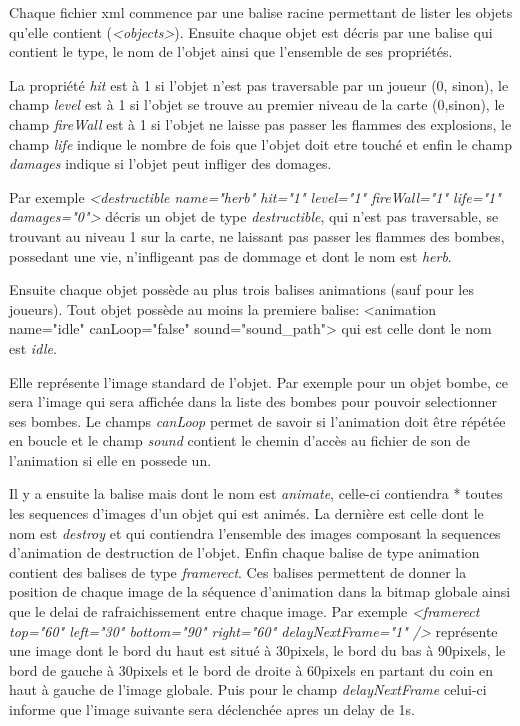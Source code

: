			Chaque fichier \gls{xml} commence par une balise racine permettant 
			de lister les objets qu'elle contient (\textit{<objects>}).
			Ensuite chaque objet est décris par une balise  qui contient le type,
			le nom de l'objet ainsi que l'ensemble de ses propriétés.
			
			La propriété \textit{hit} est à 1 si l'objet n'est pas traversable par un joueur (0, sinon), 
			le champ \textit{level} est à 1 si l'objet se trouve au premier niveau de la carte (0,sinon), 
			le champ \textit{fireWall} est à 1 si l'objet ne laisse pas passer les flammes des explosions, 
			le champ \textit{life} indique le nombre de fois que l'objet doit etre touché
			et enfin le champ \textit{damages} indique si l'objet peut infliger des domages.
			
			Par exemple \textit{<destructible name="herb" hit="1" level="1" fireWall="1" life="1" damages="0">} 
			décris un objet de type \textit{destructible}, qui n'est pas traversable, se trouvant au niveau
			1 sur la carte, ne laissant pas passer les flammes des bombes, possedant une vie, 
			n'infligeant pas de dommage et dont le nom est \textit{herb}.
			
			Ensuite chaque objet possède au plus trois balises animations (sauf pour les joueurs).
			Tout objet possède au moins la premiere balise: 
			<animation name="idle" canLoop="false" sound="sound\_path"> 
			qui est celle dont le nom est \textit{idle}.
			
			Elle représente l'image standard de l'objet.
			Par exemple pour un objet bombe, ce sera l'image qui sera affichée dans la liste des bombes 
			pour pouvoir selectionner ses bombes.
			Le champs \textit{canLoop} permet de savoir si l'animation doit être répétée en boucle 
			et le champ \textit{sound} contient le chemin d'accès au fichier de son de l'animation 
			si elle en possede un.
			
			Il y a ensuite la balise mais dont le nom est \textit{animate}, celle-ci contiendra *
			toutes les sequences d'images d'un objet qui est animés.
			La dernière est celle dont le nom est \textit{destroy} et qui contiendra 
			l'ensemble des images composant la sequences d'animation de destruction de l'objet.
			Enfin chaque balise de type animation contient des balises de type \textit{framerect}.
			Ces balises permettent de donner la position de chaque image de la séquence d'animation
			dans la bitmap globale ainsi que le delai de rafraichissement entre chaque image.
			Par exemple \textit{<framerect top="60" left="30" bottom="90" right="60" delayNextFrame="1" />}
			représente une image dont le bord du haut est situé à 30pixels, le bord du bas à 90pixels, 
			le bord de gauche à 30pixels et le bord de droite à 60pixels en partant du coin en haut à 
			gauche de l'image globale.
			Puis pour le champ \textit{delayNextFrame} celui-ci informe que l'image suivante sera déclenchée 
			apres un delay de 1s.\\
		
